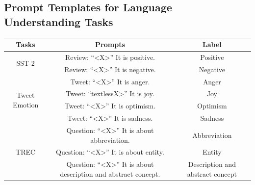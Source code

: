 \subsection{Prompt Templates for Language Understanding Tasks}
\label{appendix:a2}
\begin{table}[h]
    \centering
    \scriptsize
    \begin{tabular}{ccc}
    \toprule
    \textbf{Tasks}                            & \textbf{Prompts}                                                                              & \textbf{Label}                            \\
    \midrule
    \multirow{2}{*}{SST-2}           & Review: ``\textless{}X\textgreater{}'' It is positive.                                 & Positive                         \\
                                     & Review: ``\textless{}X\textgreater{}'' It is negative.                                 & Negative                         \\
    \midrule
    \multirow{4}{*}{Tweet Emotion}   & Tweet: ``\textless{}X\textgreater{}'' It is anger.                                     & Anger                            \\
                                     & Tweet: ``textless{}X\textgreater{}'' It is joy.                                       & Joy                              \\
                                     & Tweet: ``\textless{}X\textgreater{}'' It is optimism.                                  & Optimism                         \\
                                     & Tweet: ``\textless{}X\textgreater{}'' It is sadness.                                   & Sadness                          \\
    \midrule
    \multirow{6}{*}{TREC}            & Question: ``\textless{}X\textgreater{}'' It is about abbreviation.                     & Abbreviation                     \\
                                     & Question: ``\textless{}X\textgreater{}'' It is about entity.                           & Entity                           \\
                                     & Question: ``\textless{}X\textgreater{}'' It is about description and abstract concept. & Description and abstract concept \\

\end{tabular}
\end{table}
